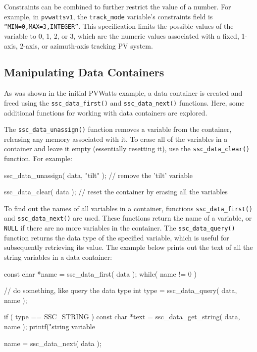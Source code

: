 \documentclass{article}
\begin{document}
Constraints can be combined to further restrict the value of a number.  For example, in \texttt{pvwattsv1}, the \texttt{track\_mode} variable's constraints field is \texttt{``MIN=0,MAX=3,INTEGER''}.  This specification limits the possible values of the variable to 0, 1, 2, or 3, which are the numeric values associated with a fixed, 1-axis, 2-axis, or azimuth-axis tracking PV system.

\subsection{Manipulating Data Containers}
\label{sec_data_manip}

As was shown in the initial PVWatts example, a data container is created and freed using the \texttt{ssc\_data\_first()} and \texttt{ssc\_data\_next()} functions.  Here, some additional functions for working with data containers are explored.

The \texttt{ssc\_data\_unassign()} function removes a variable from the container, releasing any memory associated with it.  To erase all of the variables in a container and leave it empty (essentially resetting it), use the \texttt{ssc\_data\_clear()} function.  For example:

\begin{verbatimtab}
ssc_data_unassign( data, "tilt" ); // remove the 'tilt' variable

ssc_data_clear( data ); // reset the container by erasing all the variables
\end{verbatimtab}


To find out the names of all variables in a container, functions \texttt{ssc\_data\_first()} and \texttt{ssc\_data\_next()} are used.  These functions return the name of a variable, or \texttt{NULL} if there are no more variables in the container.  The \texttt{ssc\_data\_query()} function returns the data type of the specified variable, which is useful for subsequently retrieving its value.  The example below prints out the text of all the string variables in a data container:

\begin{verbatimtab}[4]
const char *name = ssc_data_first( data );
while( name != 0 )
{
	// do something, like query the data type
	int type = ssc_data_query( data, name );

	if ( type == SSC_STRING )
	{
		const char *text = ssc_data_get_string( data, name );
		printf("string variable %
	}

	name = ssc_data_next( data );
}
\end{verbatimtab}
\end{document}
